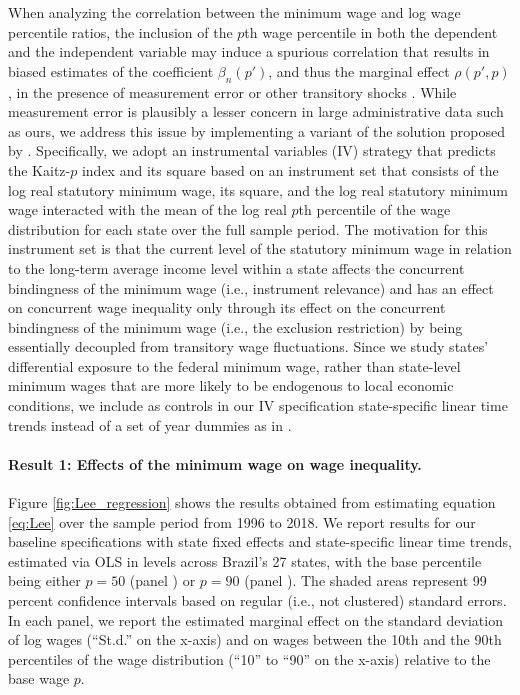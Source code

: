 When analyzing the correlation between the minimum wage and log wage percentile ratios, the inclusion of the $p$th wage percentile in both the dependent and the independent variable may induce a spurious correlation that results in biased estimates of the coefficient $\beta_{n}(p')$, and thus the marginal effect $\rho(p',p)$, in the presence of measurement error or other transitory shocks \citep{Autor2016}. While measurement error is plausibly a lesser concern in large administrative data such as ours, we address this issue by implementing a variant of the solution proposed by \citet{Autor2016}. Specifically, we adopt an instrumental variables (IV) strategy that predicts the Kaitz-$p$ index and its square based on an instrument set that consists of the log real statutory minimum wage, its square, and the log real statutory minimum wage interacted with the mean of the log real $p$th percentile of the wage distribution for each state over the full sample period. The motivation for this instrument set is that the current level of the statutory minimum wage in relation to the long-term average income level within a state affects the concurrent bindingness of the minimum wage (i.e., instrument relevance) and has an effect on concurrent wage inequality only through its effect on the concurrent bindingness of the minimum wage (i.e., the exclusion restriction) by being essentially decoupled from transitory wage fluctuations. Since we study states' differential exposure to the federal minimum wage, rather than state-level minimum wages that are more likely to be endogenous to local economic conditions, we include as controls in our IV specification state-specific linear time trends instead of a set of year dummies as in \citet{Autor2016}.


\paragraph{Result 1: Effects of the minimum wage on wage inequality.}

Figure \ref{fig:Lee_regression} shows the results obtained from estimating equation \eqref{eq:Lee} over the sample period from 1996 to 2018. We report results for our baseline specifications with state fixed effects and state-specific linear time trends, estimated via OLS in levels across Brazil's 27 states, with the base percentile being either $p=50$ (panel ) or $p=90$ (panel ). The shaded areas represent 99 percent confidence intervals based on regular (i.e., not clustered) standard errors. In each panel, we report the estimated marginal effect on the standard deviation of log wages (``St.d.'' on the x-axis) and on wages between the 10th and the 90th percentiles of the wage distribution (``10'' to ``90'' on the x-axis) relative to the base wage $p$.


